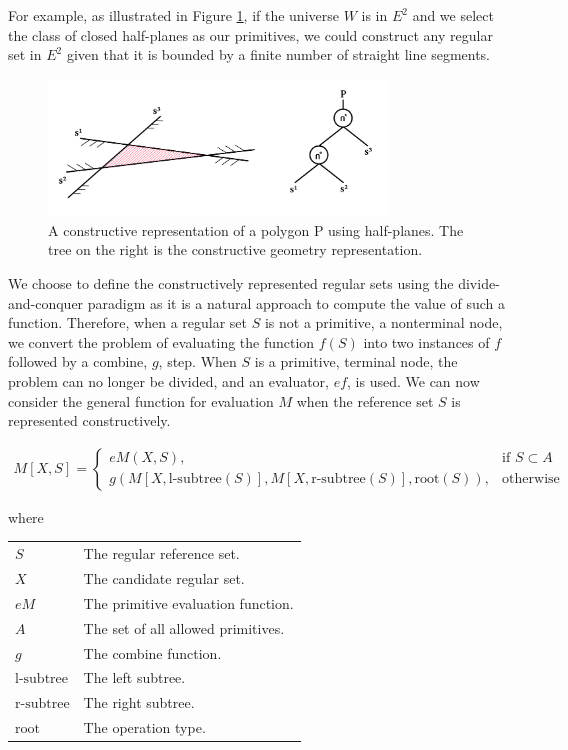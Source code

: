 \documentclass[a4paper,11pt,oneside]{article}
\makeatletter
\newenvironment{conditions}
  {\par\vspace{\abovedisplayskip}\noindent\begin{tabular}{>{$}l<{$} @{${}={}$} l}}
  {\end{tabular}\par\vspace{\belowdisplayskip}}
\makeatother
\begin{document}
For example, as illustrated in Figure \ref{sect3:halfplane-csg}, if the universe $W$ is in $E^2$ and we select the class of closed half-planes as our primitives, we could construct any regular set in $E^2$ given that it is bounded by a finite number of straight line segments.

\begin{figure}[ht]
	\begin{center}
		\includegraphics[width=0.8\textwidth]{section3/3.2/halfplane-csg.png}
	\end{center}
	\caption{A constructive representation of a polygon P using half-planes. The tree on the right is the constructive geometry representation.}
	\label{sect3:halfplane-csg}
\end{figure}

We choose to define the constructively represented regular sets using the divide-and-conquer paradigm as it is a natural approach to compute the value of such a function. Therefore, when a regular set $S$ is not a primitive, a nonterminal node, we convert the problem of evaluating the function $f(S)$ into two instances of $f$ followed by a combine, $g$, step. When $S$ is a primitive, terminal node, the problem can no longer be divided, and an evaluator, $ef$, is used. We can now consider the general function for evaluation $M$ when the reference set $S$ is represented constructively. 

\begin{align}
	M[X,S]= 
	\begin{cases}
	eM(X, S),                                                                & \text{if } S \subset A \\
	g(M[X, \text{l-subtree}(S)], M[X, \text{r-subtree}(S)], \text{root}(S)), & \text{otherwise}       
	\end{cases}
\end{align}

where

\begin{conditions}
	S     				  &  The regular reference set. \\
	X     				  &  The candidate regular set. \\
	eM     	  &  The primitive evaluation function. \\
	A     			  	  &  The set of all allowed primitives. \\
	g     				  &  The combine function. \\
	\text{l-subtree}     &  The left subtree. \\
	\text{r-subtree}     &  The right subtree. \\
	\text{root}     	  &  The operation type. \\
\end{conditions}
\end{document}
